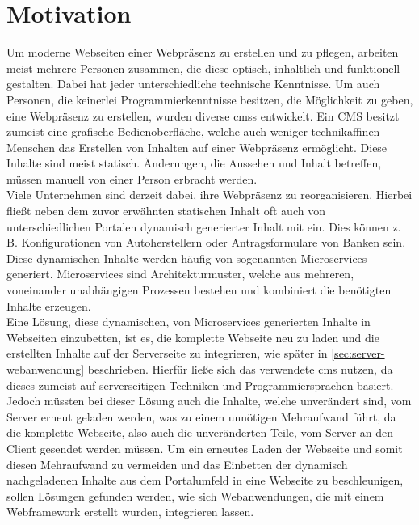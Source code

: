 \section{Motivation}

Um moderne Webseiten einer Webpräsenz zu erstellen und zu pflegen, arbeiten meist mehrere Personen zusammen, die diese optisch, inhaltlich und funktionell gestalten. Dabei hat jeder unterschiedliche technische Kenntnisse. Um auch Personen, die keinerlei Programmierkenntnisse besitzen, die Möglichkeit zu geben, eine Webpräsenz zu erstellen, wurden diverse \acfp{cms} entwickelt. Ein CMS besitzt zumeist eine grafische Bedienoberfläche, welche auch weniger technikaffinen Menschen das Erstellen von Inhalten auf einer Webpräsenz ermöglicht. Diese Inhalte sind meist statisch. Änderungen, die Aussehen und Inhalt betreffen, müssen manuell von einer Person erbracht werden. \\
Viele Unternehmen sind derzeit dabei, ihre Webpräsenz zu reorganisieren. Hierbei fließt neben dem zuvor erwähnten statischen Inhalt oft auch von unterschiedlichen Portalen dynamisch generierter Inhalt mit ein. Dies können z. B. Konfigurationen von Autoherstellern oder Antragsformulare von Banken sein. Diese dynamischen Inhalte werden häufig von sogenannten Microservices generiert. Microservices sind Architekturmuster, welche aus mehreren, voneinander unabhängigen Prozessen bestehen und kombiniert die benötigten Inhalte erzeugen. \\
Eine Lösung, diese dynamischen, von Microservices generierten Inhalte in Webseiten einzubetten, ist es, die komplette Webseite neu zu laden und die erstellten Inhalte auf der Serverseite zu integrieren, wie später in \autoref{sec:server-webanwendung} beschrieben. Hierfür ließe sich das verwendete \ac{cms} nutzen, da dieses zumeist auf serverseitigen Techniken und Programmiersprachen basiert. Jedoch müssten bei dieser Lösung auch die Inhalte, welche unverändert sind, vom Server erneut geladen werden, was zu einem unnötigen Mehraufwand führt, da die komplette Webseite, also auch die unveränderten Teile, vom Server an den Client gesendet werden müssen. Um ein erneutes Laden der Webseite und somit diesen Mehraufwand zu vermeiden und das Einbetten der dynamisch nachgeladenen Inhalte aus dem Portalumfeld in eine Webseite zu beschleunigen, sollen Lösungen gefunden werden, wie sich Webanwendungen, die mit einem Webframework erstellt wurden, integrieren lassen.